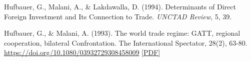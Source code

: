 \begin{tablist}
        \item[1994] \tab{}Hufbauer, G., Malani, A., \& Lakdawalla, D. (1994). Determinants of Direct Foreign Investment and Its Connection to Trade. \textit{UNCTAD Review}, 5, 39.

        \item[1993] \tab{}Hufbauer, G., \& Malani, A. (1993). The world trade regime: GATT, regional cooperation, bilateral Confrontation. The International Spectator, 28(2), 63-80. \href{https://doi.org/10.1080/03932729308458009}{https://doi.org/10.1080/03932729308458009} \href{}{[PDF]} 

    \end{tablist}

